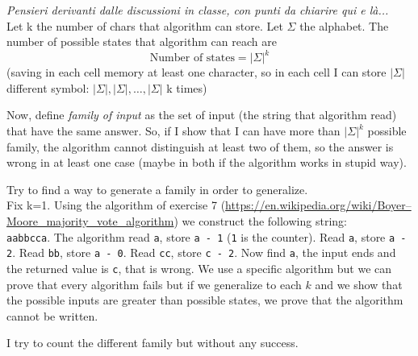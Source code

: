 \documentclass[]{article}
\begin{document}
\newcommand{\campo}[1]{\mathbb{#1}}
\textit{Pensieri derivanti dalle discussioni in classe, con punti da chiarire qui e là...}
\\

Let k the number of chars that algorithm can store. Let $\Sigma$ the alphabet. The number of possible states that algorithm can reach are $$\text{Number of states}=|\Sigma|^k$$ 
(saving in each cell memory at least one character, so in each cell I can store $|\Sigma|$ different symbol: $|\Sigma|, |\Sigma|, \dots, |\Sigma|$ k times)

Now, define \textit{family of input} as the set of input (the string that algorithm read) that have the same answer. So, if I show that I can have more than $|\Sigma|^k$ possible family, the algorithm cannot distinguish at least two of them, so the answer is wrong in at least one case (maybe in both if the algorithm works in stupid way).

Try to find a way to generate a family in order to generalize.\\
Fix k=1. Using the algorithm of exercise 7 (\url{https://en.wikipedia.org/wiki/Boyer–Moore_majority_vote_algorithm}) we construct the following string:\\
\texttt{aabbcca}. The algorithm read \texttt{a}, store \texttt{a - 1} (\texttt{1} is the counter). Read \texttt{a}, store \texttt{a - 2}. Read \texttt{bb}, store \texttt{a - 0}. Read \texttt{cc}, store \texttt{c - 2}. Now find \texttt{a}, the input ends and the returned value is \texttt{c}, that is wrong. We use a specific algorithm but we can prove that every algorithm fails but if we generalize to each $k$ and we show that the possible inputs are greater than possible states, we prove that the algorithm cannot be written. 

I try to count the different family but without any success.
\end{document}

